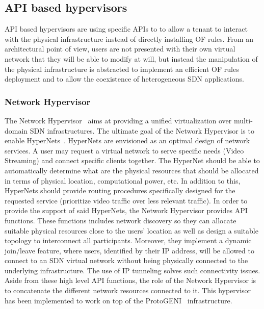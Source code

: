\subsection{API based hypervisors}
API based hypervisors are using specific APIs to to allow a tenant to interact with the physical infrastructure instead of directly installing OF rules.
From an architectural point of view, users are not presented with their own virtual network that they will be able to modify at will, but instead the manipulation of the physical infrastructure is abstracted to implement an efficient OF rules deployment and to allow the coexistence of heterogeneous SDN applications.


\subsubsection{Network Hypervisor}
The Network Hypervisor~\cite{NetworkHypervisor-Huang2013} aims at providing a unified virtualization over multi-domain SDN infrastructures. 
The ultimate goal of the Network Hypervisor is to enable HyperNets~\cite{HyperNet-Huang2013a}. HyperNets are envisioned as an optimal design of network services. A user may request a virtual network to serve specific needs (\eg Video Streaming) and connect specific clients together.
The HyperNet should be able to automatically determine what are the physical resources that should be allocated in terms of physical location, computational power, etc. In addition to this, HyperNets should provide routing procedures specifically designed for the requested service (\ie prioritize video traffic over less relevant traffic).
In order to provide the support of said HyperNets, the Network Hypervisor provides API functions. These functions includes network discovery so they can allocate suitable physical resources close to the users' location as well as design a suitable topology to interconnect all participants.
Moreover, they implement a dynamic join/leave feature, where users, identified by their IP address, will be allowed to connect to an SDN virtual network without being physically connected to the underlying infrastructure. The use of IP tunneling solves such connectivity issues.
Aside from these high level API functions, the role of the Network Hypervisor is to concatenate the different network resources connected to it.
This hypervisor has been implemented to work on top of the ProtoGENI~\cite{protoGENI} infrastructure.


